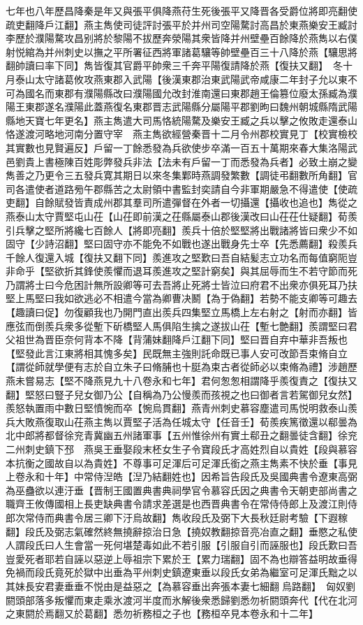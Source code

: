 七年也八年歷昌降秦是年又與張平俱降燕苻生死後張平又降晋各受爵位將即亮翻使疏吏翻降戶江翻】燕主雋使司徒評討張平於并州司空陽騖討高昌於東燕樂安王臧討李歷於濮陽騖攻昌别將於黎陽不拔歷奔滎陽其衆皆降并州壁壘百餘降於燕雋以右僕射悦綰為并州刺史以撫之平所署征西將軍諸葛驤等帥壁壘百三十八降於燕【驤思將翻帥讀曰率下同】雋皆復其官爵平帥衆三千奔平陽復請降於燕【復扶又翻】　冬十月泰山太守諸葛攸攻燕東郡入武陽【後漢東郡治東武陽武帝咸康二年封子允以東不可為國名而東郡有濮陽縣改曰濮陽國允改封淮南還曰東郡趙王倫篡位廢太孫臧為濮陽王東郡遂名濮陽此蓋燕復名東郡晋志武陽縣分屬陽平郡劉昫曰魏州朝城縣隋武陽縣地天寶七年更名】燕主雋遣大司馬恪統陽騖及樂安王臧之兵以擊之攸敗走還泰山恪遂渡河略地河南分置守宰　燕主雋欲經營秦晋十二月令州郡校實見丁【校實檢校其實數也見賢遍反】戶留一丁餘悉發為兵欲使步卒滿一百五十萬期來春大集洛陽武邑劉貴上書極陳百姓彫弊發兵非法【法未有戶留一丁而悉發為兵者】必致土崩之變雋善之乃更令三五發兵寛其期日以來冬集鄴時燕調發繁數【調徒弔翻數所角翻】官司各遣使者道路㫄午郡縣苦之太尉領中書監封奕請自今非軍期嚴急不得遣使【使疏吏翻】自餘賦發皆責成州郡其羣司所遣彈督在外者一切攝還【攝收也追也】雋從之　燕泰山太守賈堅屯山茌【山茌即前漢之茌縣屬泰山郡後漢改曰山茌茌仕疑翻】荀羨引兵擊之堅所將纔七百餘人【將即亮翻】羨兵十倍於堅堅將出戰諸將皆曰衆少不如固守【少詩沼翻】堅曰固守亦不能免不如戰也遂出戰身先士卒【先悉薦翻】殺羨兵千餘人復還入城【復扶又翻下同】羨進攻之堅歎曰吾自結髪志立功名而每值窮阨豈非命乎【堅欲折其鋒使羨懼而退耳羨進攻之堅計窮矣】與其屈辱而生不若守節而死乃謂將士曰今危困計無所設卿等可去吾將止死將士皆泣曰府君不出衆亦俱死耳乃扶堅上馬堅曰我如欲逃必不相遣今當為卿曹决鬭【為于偽翻】若勢不能支卿等可趣去【趣讀曰促】勿復顧我也乃開門直出羨兵四集堅立馬橋上左右射之【射而亦翻】皆應弦而倒羨兵衆多從塹下斫橋堅人馬俱陷生擒之遂拔山茌【塹七艶翻】羨謂堅曰君父祖世為晋臣奈何背本不降【背蒲妹翻降戶江翻下同】堅曰晋自弃中華非吾叛也【堅發此言江東將相其愧多矣】民既無主強則託命既已事人安可改節吾束脩自立【謂從師就學便有志於自立朱子曰脩脯也十脡為束古者從師必以束脩為禮】涉趙歷燕未嘗易志【堅不降燕見九十八卷永和七年】君何怱怱相謂降乎羨復責之【復扶又翻】堅怒曰豎子兒女御乃公【自稱為乃公慢羨而孩視之也曰御者言若駕御兒女然】羨怒執置雨中數日堅憤惋而卒【惋烏貫翻】燕青州刺史慕容塵遣司馬悦明救泰山羨兵大敗燕復取山茌燕主雋以賈堅子活為任城太守【任音壬】荀羨疾篤徵還以郗曇為北中郎將都督徐兖青冀幽五州諸軍事【五州惟徐州有實土郗丑之翻曇徒含翻】徐兖二州刺史鎮下邳　燕吳王垂娶段末柸女生子令寶段氏才高姓烈自以貴姓【段與慕容本抗衡之國故自以為貴姓】不尊事可足渾后可足渾氏銜之燕主雋素不快於垂【事見上卷永和十年】中常侍湼皓【湼乃結翻姓也】因希旨告段氏及吳國典書令遼東高弼為巫蠱欲以連汙垂【晋制王國置典書典祠學官令慕容氏因之典書令天朝吏部尚書之職齊王攸傳國相上長吏缺典書令請求差選是也西晋典書令在常侍侍郎上及渡江則侍郎次常侍而典書令居三卿下汙烏故翻】雋收段氏及弼下大長秋廷尉考驗【下遐稼翻】段氏及弼志氣確然終無撓辭掠治日急【撓奴教翻掠音亮冶直之翻】垂愍之私使人謂段氏曰人生會當一死何堪楚毒如此不若引服【引服自引而誣服也】段氏歎曰吾豈愛死者耶若自誣以惡逆上辱祖宗下累於王【累力瑞翻】固不為也辯答益明故垂得免禍而段氏竟死於獄中出垂為平州刺史鎮遼東垂以段氏女弟為繼室可足渾氏黜之以其妹長安君妻垂垂不悦由是益惡之【為慕容垂出奔張本妻七細翻烏路翻】　匈奴劉閼頭部落多叛懼而東走乘氷渡河半度而氷解後衆悉歸劉悉勿祈閼頭奔代【代在北河之東閼於焉翻又於葛翻】悉勿祈務桓之子也【務桓卒見本卷永和十二年】


